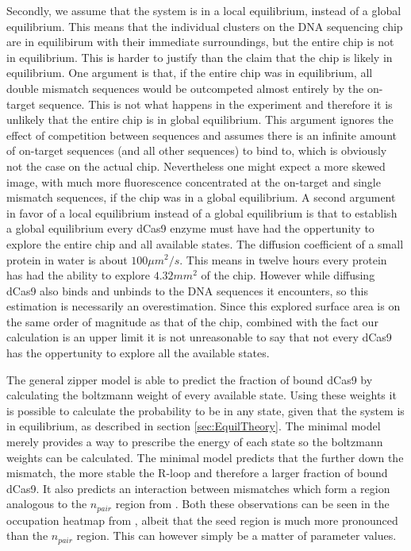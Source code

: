 Secondly, we assume that the system is in a local equilibrium, instead of a global equilibrium. This means that the individual clusters on the DNA sequencing chip are in equilibirum with their immediate surroundings, but the entire chip is not in equilibrium. %
This is harder to justify than the claim that the chip is likely in equilibrium. One argument is that, if the entire chip was in equilibrium, all double mismatch sequences would be outcompeted almost entirely by the on-target sequence. This is not what happens in the experiment and therefore it is unlikely that the entire chip is in global equilibrium. This argument ignores the effect of competition between sequences and assumes there is an infinite amount of on-target sequences (and all other sequences) to bind to, which is obviously not the case on the actual chip. Nevertheless one might expect a more skewed image, with much more fluorescence concentrated at the on-target and single mismatch sequences, if the chip was in a global equilibrium. A second argument in favor of a local equilibrium instead of a global equilibrium is that to establish a global equilibrium every dCas9 enzyme must have had the oppertunity to explore the entire chip and all available states. The diffusion coefficient of a small protein in water is about $100 \mu m^2/s$. %
This means in twelve hours every protein has had the ability to explore $4.32 mm^2$ of the chip. However while diffusing dCas9 also binds and unbinds to the DNA sequences it encounters, so this estimation is necessarily an overestimation. Since this explored surface area is on the same order of magnitude as that of the chip, combined with the fact our calculation is an upper limit it is not unreasonable to say that not every dCas9 has the oppertunity to explore all the available states. %

The general zipper model is able to predict the fraction of bound dCas9 by calculating the boltzmann weight of every available state. Using these weights it is possible to calculate the probability to be in any state, given that the system is in equilibrium, as described in section \ref{sec:EquilTheory}. The minimal model merely provides a way to prescribe the energy of each state so the boltzmann weights can be calculated. The minimal model predicts that the further down the mismatch, the more stable the R-loop and therefore a larger fraction of bound dCas9. It also predicts an interaction between mismatches which form a region analogous to the $n_{pair}$ region from \cite{Misha}. Both these observations can be seen in the occupation heatmap from \cite{PNAS}, albeit that the seed region is much more pronounced than the $n_{pair}$ region. This can however simply be a matter of parameter values.


